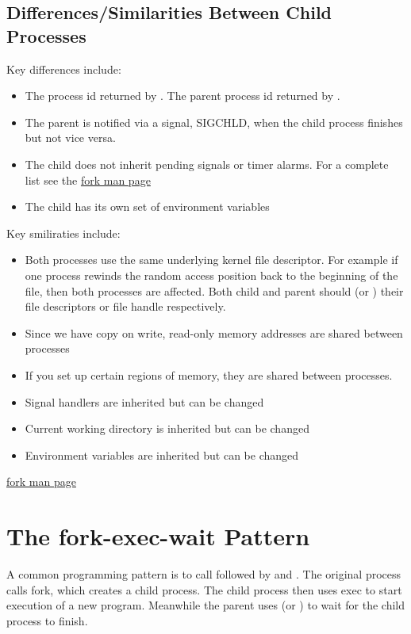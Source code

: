\subsection{Differences/Similarities Between Child Processes}

Key differences include: 
\begin{itemize}
\item The process id returned by . The parent process id returned by . 
\item The parent is notified via a signal, SIGCHLD, when the child process finishes but not vice versa. 
\item The child does not inherit pending signals or timer alarms. For a complete list see the \href{http://man7.org/linux/man-pages/man2/fork.2.html}{fork man page}
\item The child has its own set of environment variables
\end{itemize}

Key smiliraties include:
\begin{itemize}
\item Both processes use the same underlying kernel file descriptor. For example if one process rewinds the random access position back to the beginning of the file, then both processes are affected. Both child and parent should  (or ) their file descriptors or file handle respectively.
\item Since we have copy on write, read-only memory addresses are shared between processes
\item If you set up certain regions of memory, they are shared between processes.
\item Signal handlers are inherited but can be changed
\item Current working directory is inherited but can be changed
\item Environment variables are inherited but can be changed
\end{itemize}

\href{http://linux.die.net/man/2/fork}{fork man page}

\section{The fork-exec-wait Pattern}

A common programming pattern is to call  followed by  and . The original process calls fork, which creates a child process. The child process then uses exec to start execution of a new program. Meanwhile the parent uses  (or ) to wait for the child process to finish. 

